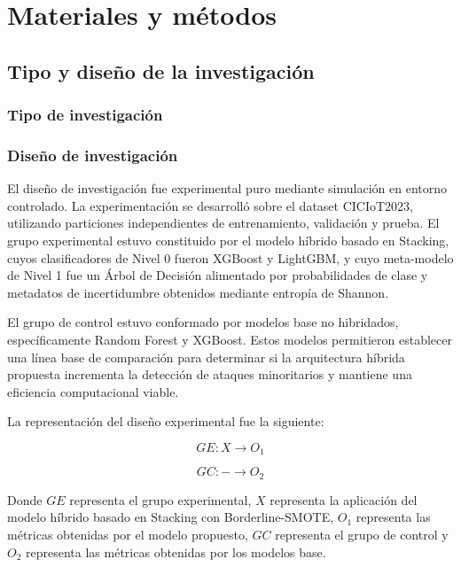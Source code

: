 \documentclass[12pt,a4paper]{article}
\begin{document}
\setcounter{section}{3}
\section{Materiales y métodos}

\subsection{Tipo y diseño de la investigación}

\subsubsection{Tipo de investigación}

\subsubsection{Diseño de investigación}

El diseño de investigación fue experimental puro mediante simulación en entorno controlado. La experimentación se desarrolló sobre el dataset CICIoT2023, utilizando particiones independientes de entrenamiento, validación y prueba. El grupo experimental estuvo constituido por el modelo híbrido basado en Stacking, cuyos clasificadores de Nivel 0 fueron XGBoost y LightGBM, y cuyo meta-modelo de Nivel 1 fue un Árbol de Decisión alimentado por probabilidades de clase y metadatos de incertidumbre obtenidos mediante entropía de Shannon.

El grupo de control estuvo conformado por modelos base no hibridados, específicamente Random Forest y XGBoost. Estos modelos permitieron establecer una línea base de comparación para determinar si la arquitectura híbrida propuesta incrementa la detección de ataques minoritarios y mantiene una eficiencia computacional viable.

La representación del diseño experimental fue la siguiente:

\[
GE: X \rightarrow O_1
\]

\[
GC: - \rightarrow O_2
\]

Donde $GE$ representa el grupo experimental, $X$ representa la aplicación del modelo híbrido basado en Stacking con Borderline-SMOTE, $O_1$ representa las métricas obtenidas por el modelo propuesto, $GC$ representa el grupo de control y $O_2$ representa las métricas obtenidas por los modelos base.
\end{document}

